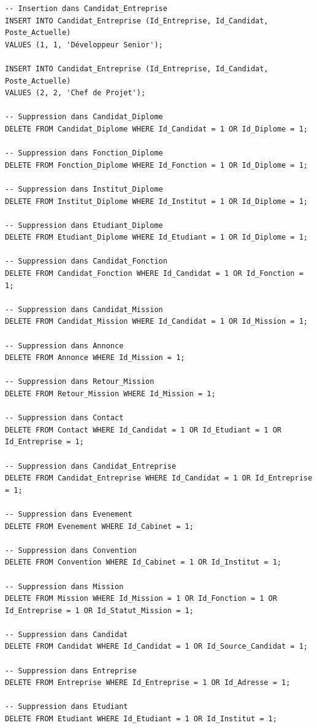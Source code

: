 \documentclass[a4paper,12pt]{article}
\begin{document}
\begin{verbatim}
-- Insertion dans Candidat_Entreprise
INSERT INTO Candidat_Entreprise (Id_Entreprise, Id_Candidat, Poste_Actuelle)
VALUES (1, 1, 'Développeur Senior');

INSERT INTO Candidat_Entreprise (Id_Entreprise, Id_Candidat, Poste_Actuelle)
VALUES (2, 2, 'Chef de Projet');

-- Suppression dans Candidat_Diplome
DELETE FROM Candidat_Diplome WHERE Id_Candidat = 1 OR Id_Diplome = 1;

-- Suppression dans Fonction_Diplome
DELETE FROM Fonction_Diplome WHERE Id_Fonction = 1 OR Id_Diplome = 1;

-- Suppression dans Institut_Diplome
DELETE FROM Institut_Diplome WHERE Id_Institut = 1 OR Id_Diplome = 1;

-- Suppression dans Etudiant_Diplome
DELETE FROM Etudiant_Diplome WHERE Id_Etudiant = 1 OR Id_Diplome = 1;

-- Suppression dans Candidat_Fonction
DELETE FROM Candidat_Fonction WHERE Id_Candidat = 1 OR Id_Fonction = 1;

-- Suppression dans Candidat_Mission
DELETE FROM Candidat_Mission WHERE Id_Candidat = 1 OR Id_Mission = 1;

-- Suppression dans Annonce
DELETE FROM Annonce WHERE Id_Mission = 1;

-- Suppression dans Retour_Mission
DELETE FROM Retour_Mission WHERE Id_Mission = 1;

-- Suppression dans Contact
DELETE FROM Contact WHERE Id_Candidat = 1 OR Id_Etudiant = 1 OR Id_Entreprise = 1;

-- Suppression dans Candidat_Entreprise
DELETE FROM Candidat_Entreprise WHERE Id_Candidat = 1 OR Id_Entreprise = 1;

-- Suppression dans Evenement
DELETE FROM Evenement WHERE Id_Cabinet = 1;

-- Suppression dans Convention
DELETE FROM Convention WHERE Id_Cabinet = 1 OR Id_Institut = 1;

-- Suppression dans Mission
DELETE FROM Mission WHERE Id_Mission = 1 OR Id_Fonction = 1 OR Id_Entreprise = 1 OR Id_Statut_Mission = 1;

-- Suppression dans Candidat
DELETE FROM Candidat WHERE Id_Candidat = 1 OR Id_Source_Candidat = 1;

-- Suppression dans Entreprise
DELETE FROM Entreprise WHERE Id_Entreprise = 1 OR Id_Adresse = 1;

-- Suppression dans Etudiant
DELETE FROM Etudiant WHERE Id_Etudiant = 1 OR Id_Institut = 1;


\end{verbatim}
\end{document}
